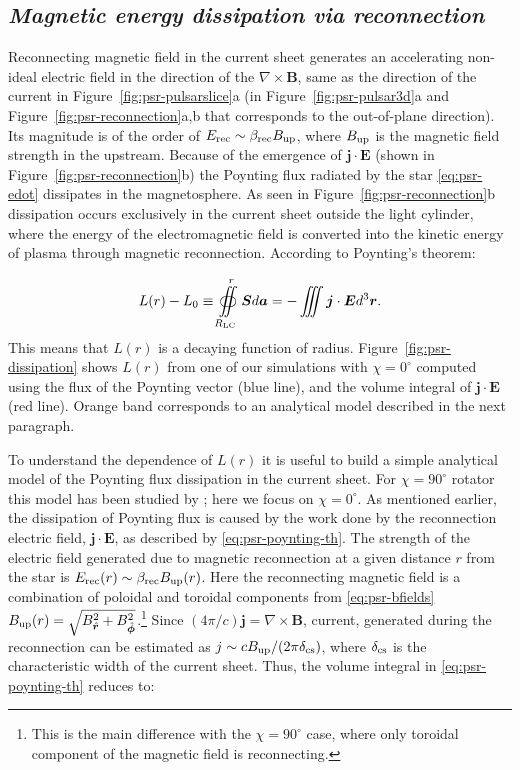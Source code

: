 \subsection*{\small\it Magnetic energy dissipation via reconnection}

Reconnecting magnetic field in the current sheet generates an accelerating non-ideal electric field in the direction of the $\nabla\times \bm{B}$, same as the direction of the current in Figure~\ref{fig:psr-pulsarslice}a (in Figure~\ref{fig:psr-pulsar3d}a and Figure~\ref{fig:psr-reconnection}a,b that corresponds to the out-of-plane direction). Its magnitude is of the order of $E_{\rm rec}\sim \beta_{\rm rec}B_{\rm up}$, where $B_{\rm up}$ is the magnetic field strength in the upstream. Because of the emergence of $\bm{j}\cdot \bm{E}$ (shown in Figure~\ref{fig:psr-reconnection}b) the Poynting flux radiated by the star \eqref{eq:psr-edot} dissipates in the magnetosphere. As seen in Figure~\ref{fig:psr-reconnection}b dissipation occurs exclusively in the current sheet outside the light cylinder, where the energy of the electromagnetic field is converted into the kinetic energy of plasma through magnetic reconnection. According to Poynting's theorem:

\begin{equation}
\label{eq:psr-poynting-th}
    L(r) - L_0 \equiv \oiint\limits_{R_{\rm LC}}^r \bm{S} d\bm{a} = -\iiint \bm{j}\cdot \bm{E}d^3\bm{r}.
\end{equation}
\noindent This means that $L(r)$ is a decaying function of radius. Figure~\ref{fig:psr-dissipation} shows $L(r)$ from one of our simulations with $\chi=0^\circ$ computed using the flux of the Poynting vector (blue line), and the volume integral of $\bm{j}\cdot\bm{E}$ (red line). Orange band corresponds to an analytical model described in the next paragraph.

To understand the dependence of $L(r)$ it is useful to build a simple analytical model of the Poynting flux dissipation in the current sheet. For $\chi=90^\circ$ rotator this model has been studied by \cite{2020A&A...642A.204C}; here we focus on $\chi=0^\circ$. As mentioned earlier, the dissipation of Poynting flux is caused by the work done by the reconnection electric field, $\bm{j}\cdot\bm{E}$, as described by \eqref{eq:psr-poynting-th}. The strength of the electric field generated due to magnetic reconnection at a given distance $r$ from the star is $E_{\rm rec}(r)\sim\beta_{\rm rec} B_{\rm up}(r)$. Here the reconnecting magnetic field is a combination of poloidal and toroidal components from \eqref{eq:psr-bfields} $B_{\rm up}(r) =\sqrt{B_{\hat{\bm{r}}}^2 + B_{\hat{\bm{\phi}}}^2}$.\footnote{This is the main difference with the $\chi=90^\circ$ case, where only toroidal component of the magnetic field is reconnecting.} Since $(4\pi/c)\bm{j}=\nabla\times\bm{B}$, current, generated during the reconnection can be estimated as $j\sim c B_{\rm up} / (2\pi \delta_{\rm cs})$, where $\delta_{\rm cs}$ is the characteristic width of the current sheet. Thus, the volume integral in \eqref{eq:psr-poynting-th} reduces to:

